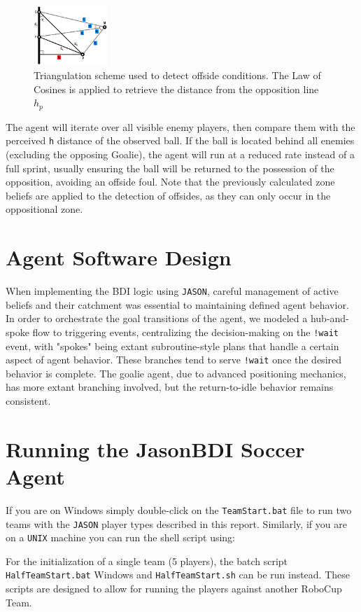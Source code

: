 \documentclass[conference]{IEEEtran}
\begin{document}
\begin{figure}[ht!]
        \centering\centerline{\includegraphics[width=0.25\textwidth]{Figures/triangulation.png}}
        \caption{Triangulation scheme used to detect offside conditions. The Law of Cosines is applied to retrieve the distance from the opposition line $h_p$}
        \label{fig:offsideTriangulation}
\end{figure}

The agent will iterate over all visible enemy players, then compare them with the perceived \texttt{h} distance of the observed ball. If the ball is located behind all enemies (excluding the opposing Goalie), the agent will run at a reduced rate instead of a full sprint, usually ensuring the ball will be returned to the possession of the opposition, avoiding an offside foul. Note that the previously calculated zone beliefs are applied to the detection of offsides, as they can only occur in the oppositional zone.

\section{Agent Software Design}
When implementing the BDI logic using \texttt{JASON}, careful management of active beliefs and their catchment was essential to maintaining defined agent behavior. In order to orchestrate the goal transitions of the agent, we modeled a hub-and-spoke flow to triggering events, centralizing the decision-making on the \texttt{!wait} event, with "spokes" being extant subroutine-style plans that handle a certain aspect of agent behavior. These branches tend to serve \texttt{!wait} once the desired behavior is complete. The goalie agent, due to advanced positioning mechanics, has more extant branching involved, but the return-to-idle behavior remains consistent.

\section{Running the JasonBDI Soccer Agent}
If you are on Windows simply double-click on the \texttt{TeamStart.bat} file to run two teams with the \texttt{JASON} player types described in this report. Similarly, if you are on a \texttt{UNIX} machine you can run the shell script using: 
\noindent For the initialization of a single team (5 players), the batch script \texttt{HalfTeamStart.bat} Windows and \texttt{HalfTeamStart.sh} can be run instead. These scripts are designed to allow for running the players against another RoboCup Team.
\end{document}
